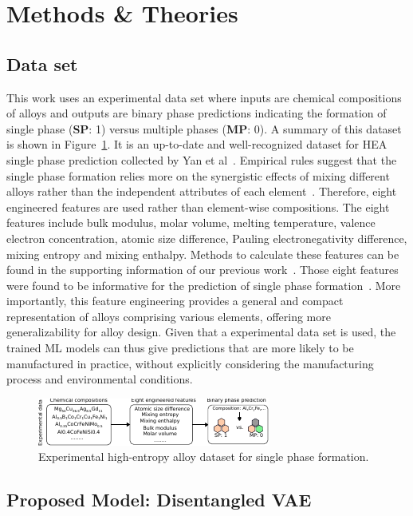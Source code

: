 \documentclass[a4paper]{article}
\begin{document}
\section{Methods \& Theories}
\subsection{Data set}
This work uses an experimental data set where inputs are chemical compositions of alloys and outputs are binary phase predictions indicating the formation of single phase (\textbf{SP}: 1) versus multiple phases (\textbf{MP}: 0).
A summary of this dataset is shown in Figure~\ref{fig:dataset}.
It is an up-to-date and well-recognized dataset for HEA single phase prediction collected by Yan et al~\cite{yan2021}.
Empirical rules suggest that the single phase formation relies more on the synergistic effects of mixing different alloys rather than the independent attributes of each element~\cite{yan2021, pei2020}.
Therefore, eight engineered features are used rather than element-wise compositions.
The eight features include bulk modulus, molar volume, melting temperature, valence electron concentration, atomic size difference, Pauling electronegativity difference, mixing entropy and mixing enthalpy.
Methods to calculate these features can be found in the supporting information of our previous work~\cite{zeng2024}.
Those eight features were found to be informative for the prediction of single phase formation~\cite{zeng2024, yan2021}.
More importantly, this feature engineering provides a general and compact representation of alloys comprising various elements, offering more generalizability for alloy design.
Given that a experimental data set is used, the trained ML models can thus give predictions that are more likely to be manufactured in practice, without explicitly considering the manufacturing process and environmental conditions.

\begin{figure}
\centering
\includegraphics[width=5.in]{figures/dataset.pdf}
\caption{Experimental high-entropy alloy dataset for single phase formation.
\label{fig:dataset}}
\end{figure}

\subsection{Proposed Model: Disentangled VAE}
\end{document}
